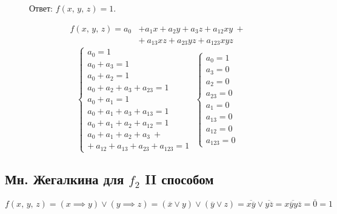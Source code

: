 \documentclass[12pt,a4paper]{article}
\theoremstyle{plain}
\theoremstyle{definition}
\theoremstyle{remark}
\numberwithin{equation}{section}
\begin{document}
\begin{figure}[H]
\begin{minipage}[t]{0.55\textwidth}
    \vspace{0.5em}
    \noindent Ответ: $f(x,\,y,\,z) = 1$.
  \end{minipage} \hfill 
  \begin{minipage}[t]{0.5\textwidth}
    \vspace{0em}
    \begin{equation*}
      \begin{aligned}
        f(x,\,y,\,z) = a_0 &+ a_1x + a_2y + a_3z + a_{12}xy \ + \\ 
                           &+ \ a_{13}xz + a_{23}yz + a_{123}xyz
      \end{aligned}
    \end{equation*}
    \begin{equation*}
      \begin{cases}
        a_0 = 1 \\
        a_0 + a_3 = 1 \\
        a_0 + a_2 = 1 \\
        a_0 + a_2 + a_3 + a_{23} = 1 \\
        a_0 + a_1 = 1 \\ 
        a_0 + a_1 + a_3 + a_{13} = 1 \\
        a_0 + a_1 + a_2 + a_{12} = 1 \\
        a_0 + a_1 + a_2 + a_3 \ + \\ + \ a_{12} + a_{13} + a_{23} + a_{123} = 1
      \end{cases} \;
      \begin{cases}
        a_0 = 1 \\
        a_3 = 0 \\
        a_2 = 0 \\
        a_{23} = 0 \\
        a_1 = 0 \\ 
        a_{13} = 0 \\
        a_{12} = 0 \\
        a_{123} = 0
      \end{cases} 
    \end{equation*}
  \end{minipage}
\end{figure}

\subsection{Мн. Жегалкина для $f_2$ II способом}

\begin{equation*}
  f(x,\,y,\,z) = (x \implies y) \lor (y \implies z) = (\overline{x} \lor y) \lor (\overline{y} \lor z) = \overline{x\overline{y}} \lor \overline{y\overline{z}} = \overline{x\overline yy\overline{z}} = \overline 0 = 1
\end{equation*}
\end{document}
